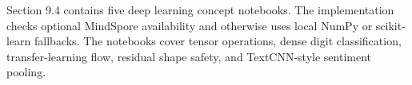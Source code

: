 Section 9.4 contains five deep learning concept notebooks. The implementation checks optional MindSpore availability and otherwise uses local NumPy or scikit-learn fallbacks. The notebooks cover tensor operations, dense digit classification, transfer-learning flow, residual shape safety, and TextCNN-style sentiment pooling.
